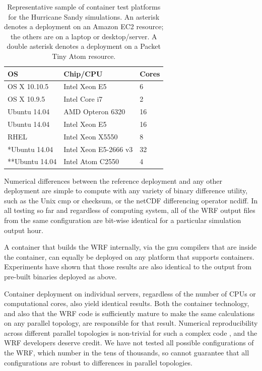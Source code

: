 \documentclass[final]{ametsoc}
\begin{document}

\begin{table}\caption{\label{Ta:Platforms} Representative sample of container test platforms for the Hurricane Sandy simulations. An asterisk denotes a deployment on an Amazon EC2 resource; the others are on a laptop or desktop/server. A double asterisk denotes a deployment on a Packet Tiny Atom resource.}
\begin{tabular}{lll}
\hline\hline
OS & Chip/CPU & Cores \\
\hline
OS X 10.10.5 & Intel Xeon E5 & 6 \\
OS X 10.9.5 & Intel Core i7 & 2 \\
Ubuntu 14.04 & AMD Opteron 6320 & 16 \\
Ubuntu 14.04 & Intel Xeon E5 & 16 \\
RHEL & Intel Xeon X5550 & 8 \\
*Ubuntu 14.04 & Intel Xeon E5-2666 v3 & 32 \\
**Ubuntu 14.04 & Intel Atom C2550 & 4 \\
\hline\hline
\end{tabular}
\end{table}

Numerical differences between the reference deployment and any other deployment are simple to compute with any variety of binary difference utility, such as the Unix cmp or checksum, or the netCDF differencing operator ncdiff. In all testing so far and regardless of computing system, all of the WRF output files from the same configuration are bit-wise identical for a particular simulation output hour. 

A container that builds the WRF internally, via the gnu compilers that are inside the container, can equally be deployed on any platform that supports containers.  Experiments have shown that those results are also identical to the output from pre-built binaries deployed as above.  

Container deployment on individual servers, regardless of the number of CPUs or computational cores, also yield identical results. Both the container technology, and also that the WRF code is sufficiently mature to make the same calculations on any parallel topology, are responsible for that result.  Numerical reproducibility across different parallel topologies is non-trivial for such a complex code \citep[e.g.\@][]{Thomas02}, and the WRF developers deserve credit. We have not tested all possible configurations of the WRF, which number in the tens of thousands, so cannot guarantee that all configurations are robust to differences in parallel topologies.
\end{document}

